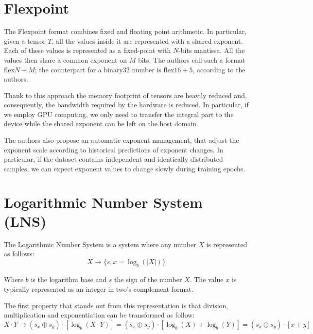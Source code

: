 \section{Flexpoint}
The Flexpoint format \cite{koster2017flexpoint,popescu2018flexpoint} combines fixed and floating point arithmetic. In particular, given a tensor $T$, all the values inside it are represented with a shared exponent. Each of these values is represented as a fixed-point with $N$-bits mantissa. All the values then share a common exponent on $M$ bits. The authors call such a format $\text{flex}N+M$; the counterpart for a binary32 number is $\text{flex}16+5$, according to the authors.

Thank to this approach the memory footprint of tensors are heavily reduced and, consequently, the bandwidth required by the hardware is reduced. In particular, if we employ GPU computing, we only need to transfer the integral part to the device while the shared exponent can be left on the host domain. 

The authors also propose an automatic exponent management, that adjust the exponent scale according to historical predictions of exponent changes. In particular, if the dataset contains independent and identically distributed samples, we can expect exponent values to change slowly during training epochs.

\section{Logarithmic Number System (LNS)}

The Logarithmic Number System is a system where any number $X$ is represented as follows:
\begin{equation}\label{eqn:logNumSysSet}
    X \xrightarrow[]{}\{ s,x = \log_b(\left| X \right|) \}
\end{equation}

Where $b$ is the logarithm base and $s$ the sign of the number $X$. The value $x$ is typically represented as an integer in two's complement format.

The first property that stands out from this representation is that division, multiplication and exponentiation can be transformed as follow:
\begin{equation}
    X\cdot Y \xrightarrow[]{} (s_x \oplus s_y)\cdot \left[ \log_b(X \cdot Y) \right] = (s_x \oplus s_y)\cdot \left[ \log_b(X) +  \log_b(Y) \right] = (s_x \oplus s_y)\cdot \left[ x+y \right]
\end{equation}

